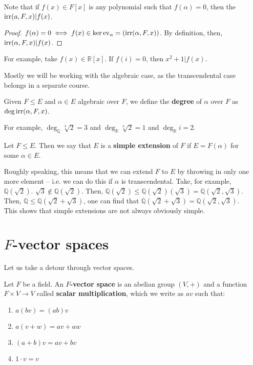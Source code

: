 \documentclass{../mathnotes}
\begin{document}
\begin{enumerate}
        \begin{rem}
        Note that if $f(x)\in F[x]$ is any polynomial such that $f(\alpha)=0$, then the $\operatorname{irr}(a,F,x)|f(x)$.
        \end{rem}
        \begin{proof}
            $f(\alpha)=0\iff f(x)\in\ker {\rm ev}_\alpha=(\operatorname{irr}(\alpha,F,x))$. By definition, then, $\operatorname{irr}(\alpha,F,x)|f(x)$.
        \end{proof}
        For example, take $f(x)\in \mathbb{R}[x]$. If $f(i)=0$, then $x^2+1|f(x)$.
\end{enumerate}

Mostly we will be working with the algebraic case, as the transcendental case belongs in a separate course.

\begin{defn}
    Given $F\leq E$ and $\alpha\in E$ algebraic over $F$, we define the \textbf{degree} of $\alpha$ over $F$ as $\deg\operatorname{irr}(\alpha,F,x)$.
\end{defn}
For example, $\deg_{\mathbb{Q}}\sqrt[3]{2}=3$ and $\deg_{\mathbb{R}}\sqrt[3]{2}=1$ and $\deg_{\mathbb{R}}i=2$.

\begin{defn}
    Let $F\leq E$. Then we say that $E$ is a \textbf{simple extension} of $F$ if $E=F(\alpha)$ for some $\alpha\in E$.
\end{defn}
Roughly speaking, this means that we can extend $F$ to $E$ by throwing in only one more element -- i.e. we can do this if $\alpha$ is transcendental.
Take, for example, $\mathbb{Q}(\sqrt{2})$. $\sqrt{3}\notin\mathbb{Q}(\sqrt{2})$. Then, $\mathbb{Q}(\sqrt{2})\leq \mathbb{Q}(\sqrt{2})(\sqrt{3})=\mathbb{Q}(\sqrt{2},\sqrt{3}).$
Then, $\mathbb{Q}\leq \mathbb{Q}(\sqrt{2}+\sqrt{3})$, one can find that $\mathbb{Q}(\sqrt{2}+\sqrt{3})=\mathbb{Q}(\sqrt{2},\sqrt{3})$. This shows
that simple extensions are not always obviously simple.

\section{$F$-vector spaces}
Let us take a detour through vector spaces.

Let $F$ be a field. An \textbf{$F$-vector space} is an abelian group $(V,+)$ and a function $F\times V\to V$ called \textbf{scalar multiplication}, which
we write as $av$ such that:
\begin{enumerate}
    \item $a(bv)=(ab)v$
    \item $a(v+w)=av+aw$
    \item $(a+b)v=av+bv$
    \item $1\cdot v=v$
\end{enumerate}
\end{document}
